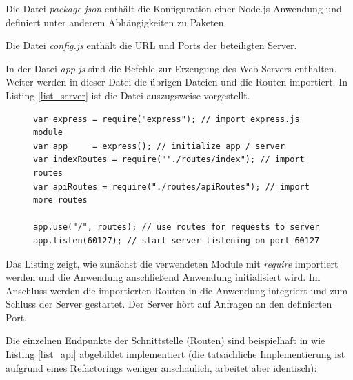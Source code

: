 Die Datei \textit{package.json} enthält die Konfiguration einer Node.js-Anwendung und 
definiert unter anderem Abhängigkeiten zu Paketen.

Die Datei \textit{config.js} enthält die URL und Ports der beteiligten Server.

In der Datei \textit{app.js} sind die Befehle zur Erzeugung des Web-Servers enthalten. Weiter werden in dieser Datei die übrigen Dateien und die Routen importiert. In Listing \ref{list_server} ist die Datei auszugsweise vorgestellt.

\begin{figure}[h]
\begin{lstlisting}[caption={Auszug aus app.js}, label=list_server]
var express	= require("express"); // import express.js module
var app		= express(); // initialize app / server
var indexRoutes = require("'./routes/index"); // import routes
var apiRoutes = require("./routes/apiRoutes"); // import more routes

app.use("/", routes); // use routes for requests to server
app.listen(60127); // start server listening on port 60127
\end{lstlisting}
\end{figure}

Das Listing zeigt, wie zunächst die verwendeten Module mit \textit{require} importiert werden und die Anwendung anschließend Anwendung initialisiert wird. Im Anschluss werden die importierten Routen in die Anwendung integriert und zum Schluss der Server gestartet. Der Server hört auf Anfragen an den definierten Port.

Die einzelnen Endpunkte der Schnittstelle (Routen) sind beispielhaft in wie Listing \ref{list_api} abgebildet implementiert (die tatsächliche Implementierung ist aufgrund eines Refactorings weniger anschaulich, arbeitet aber identisch):

